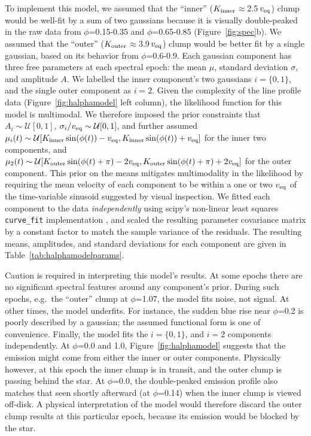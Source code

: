 \documentclass[11pt,twocolumn,tighten,linenumbers]{aastex7}
\begin{document}
To implement this model, we assumed that the ``inner'' ($K_{\rm
inner}$$\approx$2.5\,$v_{\rm eq}$) clump would be well-fit by a sum of
two gaussians because it is visually double-peaked in the raw data
from $\phi$=0.15-0.35 and $\phi$=0.65-0.85 (Figure~\ref{fig:spec}b).
We assumed that the ``outer'' ($K_{\rm outer}$$\approx$3.9\,$v_{\rm
eq}$) clump would be better fit by a single gaussian, based on its
behavior from $\phi$=0.6-0.9.  Each gaussian component has three free
parameters at each spectral epoch: the mean $\mu$, standard deviation
$\sigma$, and amplitude $A$.  We labelled the inner component's two
gaussians $i=\{ 0, 1 \}$, and the single outer component as $i=2$.
Given the complexity of the line profile data
(Figure~\ref{fig:halphamodel} left column), the likelihood function
for this model is multimodal.  We therefore imposed the prior
constraints that $A_i \sim \mathcal{U}[0,1]$,
$\sigma_i/v_{\rm eq} \sim \mathcal{U}[0,1]$, and further assumed
$\mu_i(t) \sim
\mathcal{U}[
  K_{\rm inner}\sin(\phi(t)) - v_{\rm eq},
  K_{\rm inner}\sin(\phi(t)) + v_{\rm eq}
]$
for the inner two components, and
$\mu_2(t) \sim
\mathcal{U}[
  K_{\rm outer}\sin(\phi(t) + \pi) - 2v_{\rm eq},
  K_{\rm outer}\sin(\phi(t) + \pi) + 2v_{\rm eq}
]$
for the outer component.  This prior on the means mitigates
multimodality in the likelihood by requiring the mean velocity of each
component to be within a one or two $v_{\rm eq}$ of the time-variable
sinusoid suggested by visual inspection.  We fitted each component to
the data {\it independently} using scipy's non-linear least squares
\texttt{curve\_fit} implementation \citep{Virtanen2020}, and scaled the
resulting parameter covariance matrix by a constant factor to match
the sample variance of the residuals.  The resulting means,
amplitudes, and standard deviations for each component are given in
Table~\ref{tab:halphamodelparams}.

Caution is required in interpreting this model's results.  At some
epochs there are no significant spectral features around any component's
prior.  During such epochs, e.g.~the
``outer'' clump at $\phi$=1.07, the model fits noise, not signal.  At
other times, the model underfits.  For instance, the sudden blue rise
near $\phi$=0.2 is poorly described by a gaussian; the assumed
functional form is one of convenience.  Finally, the model fits the
$i=\{ 0, 1 \}$, and $i=2$ components independently.  At $\phi$=0.0 and
1.0, Figure~\ref{fig:halphamodel} suggests that the emission might
come from either the inner or outer components.  Physically however,
at this epoch the inner clump is in transit, and the outer clump is
passing behind the star.  At $\phi$=0.0, the double-peaked emission
profile also matches that seen shortly afterward (at $\phi$=0.14) when
the inner clump is viewed off-disk.  A physical interpretation of the
model would therefore discard the outer clump results at this
particular epoch, because its emission would be blocked by the star.
\end{document}
